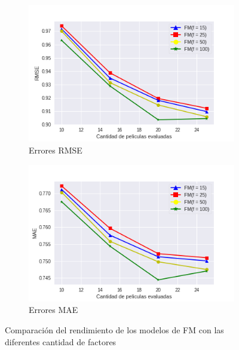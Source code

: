 \documentclass[hidelinks,12pt,a4paper]{book}
\theoremstyle{plain}
\theoremstyle{definition}
\begin{document}
\begin{figure}[!ht]
\centering
    \begin{subfigure}[b]{0.5\textwidth}            
            \includegraphics[width=\textwidth]{graficos/entr-factores-rmse.png}
            \caption{Errores RMSE}
    \end{subfigure}%
    \begin{subfigure}[b]{0.5\textwidth}
            \centering
            \includegraphics[width=\textwidth]{graficos/entr-factores-mae.png}
            \caption{Errores MAE}
    \end{subfigure}
    \caption{Comparación del rendimiento de los modelos de FM con las diferentes cantidad de factores}\label{fig:comp-fact}
\end{figure}
\end{document}

